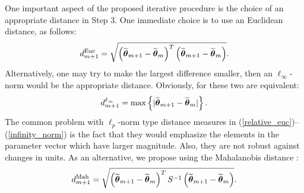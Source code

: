 \documentclass[11pt,a5paper,twoside]{book}
\newcommand{\bftheta}{\mbox{\boldmath $\theta$}}
\begin{document}
One important aspect of the proposed iterative procedure is the choice of an appropriate distance in Step 3. One immediate choice is to use an Euclidean distance, as follows:
\begin{equation}
\label{relative_euc}
d_{m+1}^{\mathrm{Euc}}=\sqrt{\left(\widetilde{\bftheta}_{m+1}- \widetilde{\bftheta}_{m}\right)^T\left(\widetilde{\bftheta}_{m+1}- \widetilde{\bftheta}_{m}\right)}.
\end{equation}
Alternatively, one may try to make the largest difference smaller, then an $\ell_{\infty}$-norm would be the appropriate distance. 
Obviously, for {\color{black}{$q=1$}} these two are equivalent:
\begin{equation}
\label{infinity_norm}
d_{m+1}^{\ell_{\infty}}= \max\left\{ |\widetilde{\bftheta}_{m+1}- \widetilde{\bftheta}_{m}|\right\}.
\end{equation}
The common problem with $\ell_p$-norm type distance measures in (\ref{relative_euc})--(\ref{infinity_norm}) is the fact that they would emphasize the elements in the parameter vector which have larger magnitude. Also, they are not robust against changes in units. {}
As an alternative, we propose using the Mahalanobis distance \citep{mahalanobis1936}: 
\begin{equation}
\label{mal_dis}
d_{m+1}^{\mathrm{Mah}} = \sqrt{\left(\widetilde{\bftheta}_{m+1}- \widetilde{\bftheta}_{m}\right)^T S^{-1} \left(\widetilde{\bftheta}_{m+1}- \widetilde{\bftheta}_{m}\right)}.
\end{equation}
\end{document}
